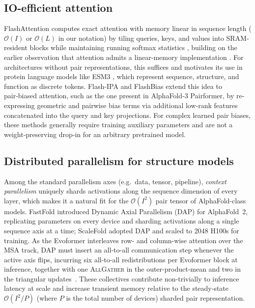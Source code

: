 \subsection{IO-efficient attention}
\label{subsec:io-efficient-attention}
FlashAttention \parencite{dao_flashattention_2022,dao_flashattention-2_2023}
computes exact attention with memory linear in sequence length 
($\mathcal{O}(I)$ or $\mathcal{O}(L)$ in our notation) by tiling queries, keys, 
and values into SRAM-resident blocks while maintaining running softmax statistics 
\parencite{milakov_online_2018}, building on the earlier observation that attention 
admits a linear-memory implementation \parencite{rabe_self-attention_2022}. 
For architectures without pair representations, this suffices and motivates its 
use in protein language models like ESM3 \parencite{hayesSimulating500Million2025}, which 
represent sequence, structure, and function as discrete tokens. Flash‑IPA \parencite{liu_flash_2025} and FlashBias \parencite{wu_flashbias_2025} 
extend this idea to pair‑biased attention, such as the one present in AlphaFold‑3 
Pairformer, by re-expressing geometric and pairwise bias terms via additional low‑rank 
features concatenated into the query and key projections. For complex learned pair
biases, these methods generally require training auxiliary parameters and are not 
a weight‑preserving drop‑in for an arbitrary pretrained model. 

\subsection{Distributed parallelism for structure models} 
Among the standard parallelism axes (e.g.\ data, tensor, pipeline), 
\emph{context parallelism} uniquely shards activations along the sequence dimension 
of every layer, which makes it a natural fit for the $\mathcal{O}(I^2)$ pair tensor 
of AlphaFold-class models. FastFold \parencite{cheng_fastfold_2023} introduced Dynamic 
Axial Parallelism (DAP) for AlphaFold~2, replicating parameters on every device and 
sharding activations along a single sequence axis at a time; 
ScaleFold \parencite{zhu_scalefold_2024} adopted DAP and scaled to 2048 H100s for training. 
As the Evoformer interleaves row- and column-wise attention over the MSA track, 
DAP must insert an all-to-all communication step whenever the active axis flips, 
incurring six all-to-all redistributions per Evoformer block at inference, together
with one \textsc{AllGather} in the outer-product-mean and two in the triangular
updates~\parencite{cheng_fastfold_2023}. These collectives contribute non-trivially 
to inference latency at scale and increase transient memory relative to the 
steady-state $\mathcal{O}(I^2/P)$ (where $P$ is the total number of devices) sharded pair representation.

